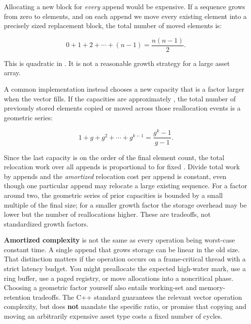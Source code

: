 \hypertarget{05-engine-i-ch005-why-vectors-usually-grow-geometrically-derive-the-cost-instead-of-repeating-amortized-o1}{}

Allocating a new block for \emph{every} append would be expensive. If a sequence grows from zero to  elements, and on each append we move every existing element into a precisely sized replacement block, the total number of moved elements is:

\[
0+1+2+\cdots+(n-1)=\frac{n(n-1)}{2}.
\]

This is quadratic in . It is not a reasonable growth strategy for a large asset array.

A common implementation instead chooses a new capacity that is a factor  larger when the vector fills. If the capacities are approximately , the total number of previously stored elements copied or moved across those reallocation events is a geometric series:

\[
1+g+g^2+\cdots+g^{k-1}
=\frac{g^k-1}{g-1}.
\]

Since the last capacity is on the order of the final element count, the total relocation work over all appends is proportional to  for fixed . Divide total work by  appends and the \emph{amortized} relocation cost per append is constant, even though one particular append may relocate a large existing sequence. For a factor around two, the geometric series of prior capacities is bounded by a small multiple of the final size; for a smaller growth factor the storage overhead may be lower but the number of reallocations higher. These are tradeoffs, not standardized growth factors.

\textbf{Amortized complexity} is not the same as every operation being worst-case constant time. A single append that grows storage can be linear in the old size. That distinction matters if the operation occurs on a frame-critical thread with a strict latency budget. You might preallocate the expected high-water mark, use a ring buffer, use a paged registry, or move allocations into a noncritical phase. Choosing a geometric factor yourself also entails working-set and memory-retention tradeoffs. The C++ standard guarantees the relevant vector operation complexity, but does \textbf{not} mandate the specific ratio, or promise that copying and moving an arbitrarily expensive asset type costs a fixed number of cycles.

